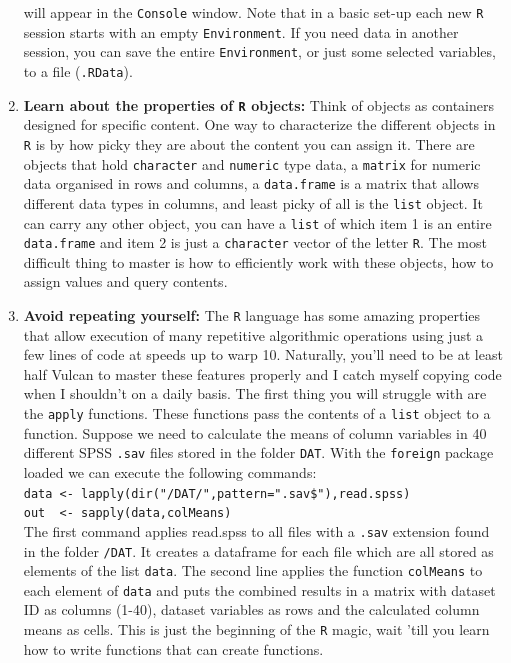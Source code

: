 \documentclass[]{book}
\begin{document}
\begin{enumerate}
  will appear in the \texttt{Console} window. Note that in a basic
  set-up each new \texttt{R} session starts with an empty
  \texttt{Environment}. If you need data in another session, you can
  save the entire \texttt{Environment}, or just some selected variables,
  to a file (\texttt{.RData}).
\item
  \textbf{Learn about the properties of \texttt{R} objects:} Think of
  objects as containers designed for specific content. One way to
  characterize the different objects in \texttt{R} is by how picky they
  are about the content you can assign it. There are objects that hold
  \texttt{character} and \texttt{numeric} type data, a \texttt{matrix}
  for numeric data organised in rows and columns, a \texttt{data.frame}
  is a matrix that allows different data types in columns, and least
  picky of all is the \texttt{list} object. It can carry any other
  object, you can have a \texttt{list} of which item 1 is an entire
  \texttt{data.frame} and item 2 is just a \texttt{character} vector of
  the letter \texttt{R}. The most difficult thing to master is how to
  efficiently work with these objects, how to assign values and query
  contents.
\item
  \textbf{Avoid repeating yourself:} The \texttt{R} language has some
  amazing properties that allow execution of many repetitive algorithmic
  operations using just a few lines of code at speeds up to warp 10.
  Naturally, you'll need to be at least half Vulcan to master these
  features properly and I catch myself copying code when I shouldn't on
  a daily basis. The first thing you will struggle with are the
  \texttt{apply} functions. These functions pass the contents of a
  \texttt{list} object to a function. Suppose we need to calculate the
  means of column variables in 40 different SPSS \texttt{.sav} files
  stored in the folder \texttt{DAT}. With the \texttt{foreign} package
  loaded we can execute the following commands:\\
  \texttt{data\ \textless{}-\ lapply(dir("/DAT/",pattern=".sav\$"),read.spss)}\\
  \texttt{out\ \ \textless{}-\ sapply(data,colMeans)}\\
  The first command applies read.spss to all files with a \texttt{.sav}
  extension found in the folder \texttt{/DAT}. It creates a dataframe
  for each file which are all stored as elements of the list
  \texttt{data}. The second line applies the function \texttt{colMeans}
  to each element of \texttt{data} and puts the combined results in a
  matrix with dataset ID as columns (1-40), dataset variables as rows
  and the calculated column means as cells. This is just the beginning
  of the \texttt{R} magic, wait 'till you learn how to write functions
  that can create functions.
\end{enumerate}
\end{document}
